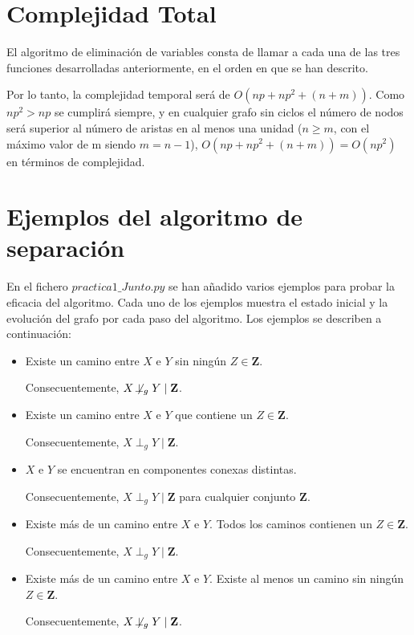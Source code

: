 \documentclass[a4paper,12pt]{article}
\newcommand{\notperpg}{\mathrel{\not\!\perp_g}}
\begin{document}
\section{Complejidad Total}
El algoritmo de eliminación de variables consta de llamar a cada una de las tres funciones desarrolladas anteriormente, en el orden en que se han descrito.

Por lo tanto, la complejidad temporal será de $O(np+np^2+(n+m))$. Como $np^2 > np$ se cumplirá siempre, y en cualquier grafo sin ciclos el número de nodos será superior al número de aristas en al menos una unidad ($n \ge m$, con el máximo valor de m siendo $m = n - 1$), $O(np+np^2+(n+m)) = O(np^2)$ en términos de complejidad.

\section{Ejemplos del algoritmo de separación}
En el fichero $practica1\_Junto.py$ se han añadido varios ejemplos para probar la eficacia del algoritmo. Cada uno de los ejemplos muestra el estado inicial y la evolución del grafo por cada paso del algoritmo. Los ejemplos se describen a continuación:

\begin{itemize}
    \item Existe un camino entre $X$ e $Y$ sin ningún $Z \in \textbf{Z}$. 
    
    Consecuentemente, $X \notperpg Y \mid \textbf{Z}$.
    
    \item Existe un camino entre $X$ e $Y$ que contiene un $Z \in \textbf{Z}$.

    Consecuentemente, $X \perp _g Y \mid \textbf{Z}$.
    
    \item $X$ e $Y$ se encuentran en componentes conexas distintas.

    Consecuentemente, $X \perp _g Y \mid \textbf{Z}$ para cualquier conjunto $\textbf{Z}$.

    \item Existe más de un camino entre $X$ e $Y$. Todos los caminos contienen un $Z \in \textbf{Z}$.

    Consecuentemente, $X \perp _g Y \mid \textbf{Z}$.

    \item Existe más de un camino entre $X$ e $Y$. Existe al menos
    un camino sin ningún $Z \in \textbf{Z}$.

    Consecuentemente, $X \notperpg Y \mid \textbf{Z}$.
    
\end{itemize}
\end{document}
